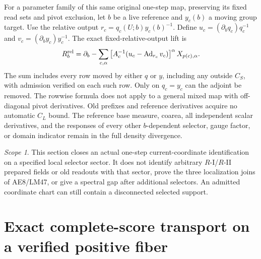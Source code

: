 \documentclass[11pt,letterpaper]{article}
\theoremstyle{plain}
\theoremstyle{remark}\newtheorem{remark}[theorem]{Scope}
\begin{document}
For a parameter family of this same original one-step map, preserving its fixed
read sets and pivot exclusion, let $b$ be a live reference and $y_c(b)$ a moving
group target. Use the relative output $r_c=q_c(U;b)y_c(b)^{-1}$. Define
$u_c=(\partial_bq_c)q_c^{-1}$ and $v_c=(\partial_by_c)y_c^{-1}$.
The exact fixed-relative-output lift is
\begin{equation}
R_b^{\rm rel}=\partial_b-\sum_{c,\alpha}
\left[A_c^{-1}(u_c-\operatorname{Ad}_{r_c}v_c)\right]^\alpha X_{p(c),\alpha}.
\label{eq:movingtarget}
\end{equation}
The sum includes every row moved by either $q$ or $y$, including any outside
$C_S$, with admission verified on each such row. Only on $q_c=y_c$ can the
adjoint be removed. The rowwise formula does not apply to a general mixed map
with off-diagonal pivot derivatives. Old prefixes and reference derivatives
acquire no automatic $C_L$ bound. The reference base measure, coarea, all
independent scalar derivatives, and the responses of every other
$b$-dependent selector, gauge factor, or domain indicator remain in the full
density divergence.

\begin{remark}
This section closes an actual one-step current-coordinate identification on a
specified local selector sector. It does not identify arbitrary $R$-I/$R$-II
prepared fields or old readouts with that sector, prove the three localization
joins of AE8/LM47, or give a spectral gap after additional selectors. An admitted
coordinate chart can still contain a disconnected selected support.
\end{remark}

\section{Exact complete-score transport on a verified positive fiber}
\label{sec:Poisson}
\end{document}
